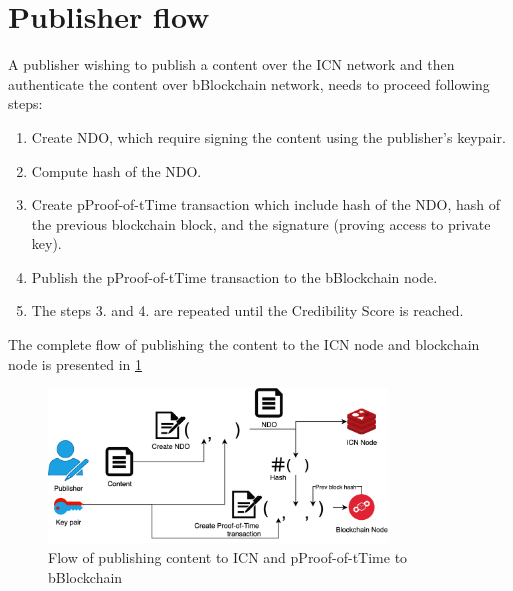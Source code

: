 \section{Publisher flow}
A publisher wishing to publish a content over the ICN network and then authenticate the content over bBlockchain network, needs to proceed following steps:
\begin{enumerate}
    \item Create NDO, which require signing the content using the publisher's keypair.
    \item Compute hash of the NDO.
    \item Create pProof-of-tTime transaction which include hash of the NDO, hash of the previous blockchain block, and the signature (proving access to private key).
    \item Publish the pProof-of-tTime transaction to the bBlockchain node.
    \item The steps 3. and 4. are repeated until the Credibility Score is reached.
\end{enumerate}
The complete flow of publishing the content to the ICN node and blockchain node is presented in \ref{fig:distribution-flow}
\begin{figure}[h!]
\includegraphics[width=9cm]{img/distribution-flow.png}
\centering
\caption{Flow of publishing content to ICN and pProof-of-tTime to bBlockchain}
\label{fig:distribution-flow}
\end{figure} 

